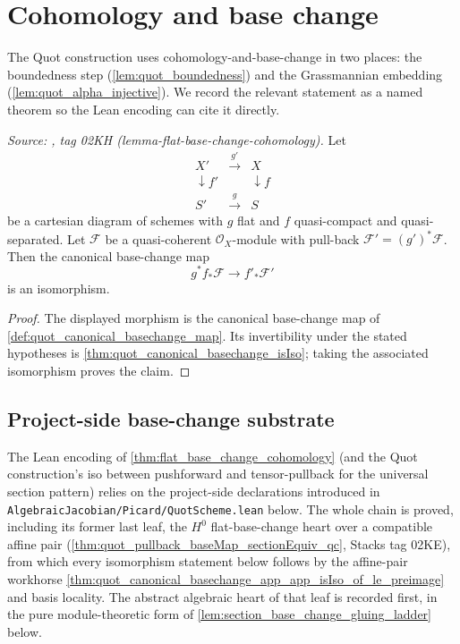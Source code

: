 \section{Cohomology and base change}
\label{sec:cohomology_base_change}

The Quot construction uses cohomology-and-base-change in two places: the
boundedness step (\cref{lem:quot_boundedness}) and the Grassmannian
embedding (\cref{lem:quot_alpha_injective}). We record the relevant
statement as a named theorem so the Lean encoding can cite it directly.

\begin{theorem}\leanok
  \label{thm:flat_base_change_cohomology}
  \textit{Source: \cite{stacks-project}, tag 02KH (lemma-flat-base-change-cohomology).}
  Let
  \[
    \begin{array}{ccc}
      X' & \xrightarrow{g'} & X \\
      \downarrow f' &  & \downarrow f \\
      S' & \xrightarrow{g} & S
    \end{array}
  \]
  be a cartesian diagram of schemes with \(g\) flat and \(f\) quasi-compact and
  quasi-separated. Let \(\mathcal{F}\) be a quasi-coherent
  \(\mathcal{O}_X\)-module with pull-back
  \(\mathcal{F}' = (g')^* \mathcal{F}\). Then the canonical base-change map
  \[
    g^* f_* \mathcal{F} \longrightarrow f'_* \mathcal{F}'
  \]
  is an isomorphism.
\end{theorem}
\begin{proof}\leanok
  The displayed morphism is the canonical base-change map of
  \cref{def:quot_canonical_basechange_map}. Its invertibility under the stated
  hypotheses is \cref{thm:quot_canonical_basechange_isIso}; taking the associated
  isomorphism proves the claim.
\end{proof}

\subsection{Project-side base-change substrate}
\label{subsec:quot_project_basechange}

The Lean encoding of \cref{thm:flat_base_change_cohomology} (and the
Quot construction's iso between pushforward and tensor-pullback for the
universal section pattern) relies on the project-side declarations
introduced in \texttt{AlgebraicJacobian/Picard/QuotScheme.lean} below.
The whole chain is proved, including its former last leaf, the \(H^0\)
flat-base-change heart over a compatible affine pair
(\cref{thm:quot_pullback_baseMap_sectionEquiv_qc}, Stacks tag 02KE), from
which every isomorphism statement below follows by the affine-pair
workhorse \cref{thm:quot_canonical_basechange_app_app_isIso_of_le_preimage}
and basis locality. The abstract algebraic heart of that leaf is recorded
first, in the pure module-theoretic form of
\cref{lem:section_base_change_gluing_ladder} below.

